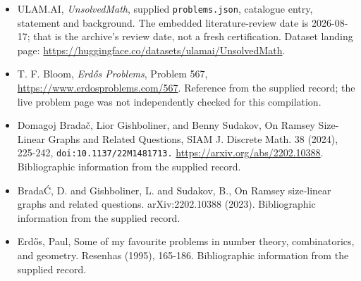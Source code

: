 \documentclass[11pt,a4paper]{article}
\begin{document}
{\small

\begin{itemize}

\item[\hypertarget{source:statement:1}{S1}] ULAM.AI, \emph{UnsolvedMath}, supplied \texttt{problems.json}, catalogue entry, statement and background. The embedded literature-review date is 2026-08-17; that is the archive’s review date, not a fresh certification. Dataset landing page: \url{https://huggingface.co/datasets/ulamai/UnsolvedMath}.

\item[\hypertarget{source:statement:2}{S2}] T. F. Bloom, \emph{Erdős Problems}, Problem 567, \url{https://www.erdosproblems.com/567}. Reference from the supplied record; the live problem page was not independently checked for this compilation.

\item[\hypertarget{source:statement:3}{S3}] Domagoj Bradač, Lior Gishboliner, and Benny Sudakov, On Ramsey Size-Linear Graphs and Related Questions, SIAM J. Discrete Math. 38 (2024), 225-242, \nolinkurl{doi:10.1137/22M1481713.} \url{https://arxiv.org/abs/2202.10388}. Bibliographic information from the supplied record.

\item[\hypertarget{source:statement:4}{S4}] Brada\'C, D. and Gishboliner, L. and Sudakov, B., On Ramsey size-linear graphs and related questions. arXiv:2202.10388 (2023). Bibliographic information from the supplied record.

\item[\hypertarget{source:statement:5}{S5}] Erd\H{o}s, Paul, Some of my favourite problems in number theory, combinatorics, and geometry. Resenhas (1995), 165-186. Bibliographic information from the supplied record.

\end{itemize}

}

\label{end:statement}
\end{document}
